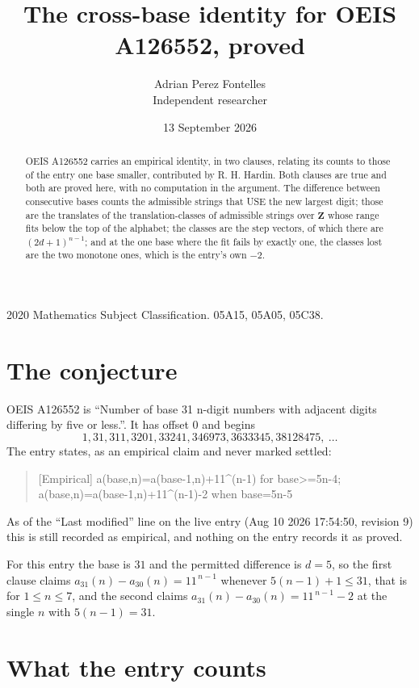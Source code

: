 \documentclass[11pt,a4paper]{article}
\title{The cross-base identity for OEIS A126552, proved}
\author{Adrian Perez Fontelles\\ \small Independent researcher}
\date{13 September 2026}
\theoremstyle{plain}
\theoremstyle{definition}
\begin{document}
\maketitle

\begin{abstract}
OEIS A126552 carries an empirical identity, in two clauses, relating its counts to those of the
entry one base smaller, contributed by R. H. Hardin. Both clauses are true and both are proved
here, with no computation in the argument. The difference between consecutive bases counts the
admissible strings that USE the new largest digit; those are the translates of the
translation-classes of admissible strings over $\mathbf{Z}$ whose range fits below the top of
the alphabet; the classes are the step vectors, of which there are $(2d+1)^{n-1}$; and at the
one base where the fit fails by exactly one, the classes lost are the two monotone ones, which
is the entry's own $-2$.
\end{abstract}

\noindent\small 2020 Mathematics Subject Classification. 05A15, 05A05, 05C38.\normalsize

\section{The conjecture}

OEIS A126552 is ``Number of base 31 n-digit numbers with adjacent digits differing by five or less.''. It has offset $0$ and begins
\[
1, 31, 311, 3201, 33241, 346973, 3633345, 38128475,\ \dots
\]
The entry states, as an empirical claim and never marked settled:
\begin{quote}
[Empirical] a(base,n)=a(base-1,n)+11\textasciicircum{}(n-1) for base>=5n-4; a(base,n)=a(base-1,n)+11\textasciicircum{}(n-1)-2 when base=5n-5
\end{quote}
As of the ``Last modified'' line on the live entry (Aug 10 2026 17:54:50, revision 9)
this is still recorded as empirical, and nothing on the entry records it as proved.

For this entry the base is $31$ and the permitted difference is $d=5$, so the first clause
claims $a_{31}(n)-a_{30}(n)=11^{\,n-1}$ whenever $5(n-1)+1\le31$, that is for
$1\le n\le7$, and the second claims $a_{31}(n)-a_{30}(n)=11^{\,n-1}-2$ at the single
$n$ with $5(n-1)=31$.

\section{What the entry counts}
\end{document}
